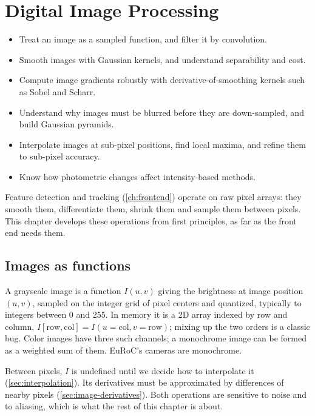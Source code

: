 \chapter{Digital Image Processing}
\label{ch:imageproc}

\begin{objectives}
\begin{itemize}
  \item Treat an image as a sampled function, and filter it by convolution.
  \item Smooth images with Gaussian kernels, and understand separability and cost.
  \item Compute image gradients robustly with derivative-of-smoothing kernels such as Sobel and Scharr.
  \item Understand why images must be blurred before they are down-sampled, and build Gaussian pyramids.
  \item Interpolate images at sub-pixel positions, find local maxima, and refine them to sub-pixel accuracy.
  \item Know how photometric changes affect intensity-based methods.
\end{itemize}
\end{objectives}

Feature detection and tracking (\cref{ch:frontend}) operate on raw pixel arrays: they smooth them, differentiate them, shrink them and sample them between
pixels. This chapter develops these operations from first principles, as far as the front end needs them.

\section{Images as functions}

A grayscale image is a function $I(u, v)$ giving the brightness at image position $(u, v)$, sampled on the integer grid of pixel centers and quantized,
typically to integers between 0 and 255. In memory it is a 2D array indexed by row and column, $I[\text{row}, \text{col}] = I(u = \text{col}, v = \text{row})$; mixing up the
two orders is a classic bug. Color images have three such channels; a monochrome image can be formed as a weighted sum of them. EuRoC's cameras are
monochrome.

Between pixels, $I$ is undefined until we decide how to interpolate it (\cref{sec:interpolation}). Its derivatives must be approximated by differences of
nearby pixels (\cref{sec:image-derivatives}). Both operations are sensitive to noise and to aliasing, which is what the rest of this chapter is about.

